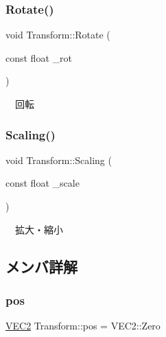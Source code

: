 \mbox{\label{class_transform_a696d7e837eafa09409150fb055daa223}} 
\subsubsection{\texorpdfstring{Rotate()}{Rotate()}}
{\footnotesize\ttfamily void Transform\+::\+Rotate (\begin{DoxyParamCaption}\item[{const float}]{\+\_\+rot }\end{DoxyParamCaption})}



　回転 

\mbox{\label{class_transform_ad6097ddf1d30f5a1023725efbee375fb}} 
\subsubsection{\texorpdfstring{Scaling()}{Scaling()}}
{\footnotesize\ttfamily void Transform\+::\+Scaling (\begin{DoxyParamCaption}\item[{const float}]{\+\_\+scale }\end{DoxyParamCaption})}



　拡大・縮小 



\subsection{メンバ詳解}
\mbox{\label{class_transform_a25bce2389cc280e8adf193bdbb00d94a}} 
\subsubsection{\texorpdfstring{pos}{pos}}
{\footnotesize\ttfamily \mbox{\hyperlink{common_8h_afb0c5e21d4133ff4f200992c0b534e1b}{V\+E\+C2}} Transform\+::pos = V\+E\+C2\+::\+Zero}

\mbox{\label{class_transform_a2b471ae0000c6959dc9b07263933aa43}} 
